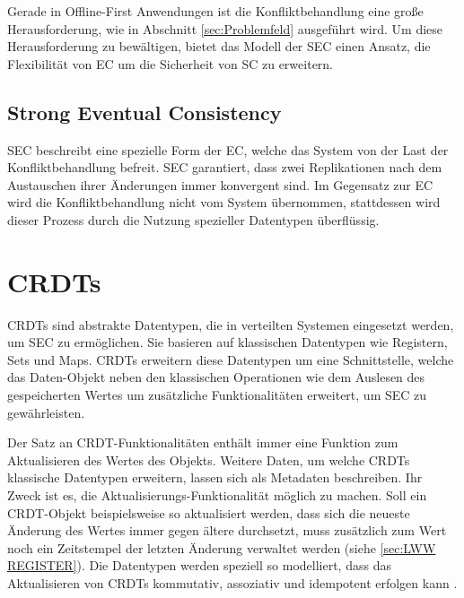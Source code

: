 \documentclass[a4paper, 12pt]{scrreprt}
\begin{document}
Gerade in Offline-First Anwendungen ist die Konfliktbehandlung eine große Herausforderung, wie in Abschnitt \ref{sec:Problemfeld} ausgeführt wird. Um diese Herausforderung zu bewältigen, bietet das Modell der \acf{SEC} einen Ansatz, die Flexibilität von \ac{EC} um die Sicherheit von \ac{SC} zu erweitern. 




\subsection{Strong Eventual Consistency}


\ac{SEC} beschreibt eine spezielle Form der \acf{EC}, welche das System von der Last der Konfliktbehandlung befreit. \ac{SEC} garantiert, dass zwei Replikationen nach dem Austauschen ihrer Änderungen immer konvergent sind. Im Gegensatz zur \ac{EC} wird die Konfliktbehandlung nicht vom System übernommen, stattdessen wird dieser Prozess durch die Nutzung spezieller Datentypen überflüssig. 


\section{CRDTs}

CRDTs sind abstrakte Datentypen, die in verteilten Systemen eingesetzt werden, um \ac{SEC} zu ermöglichen. Sie basieren auf klassischen Datentypen wie Registern, Sets und Maps. CRDTs erweitern diese Datentypen um eine Schnittstelle, welche das Daten-Objekt neben den klassischen Operationen wie dem Auslesen des gespeicherten Wertes um zusätzliche Funktionalitäten erweitert, um \ac{SEC} zu gewährleisten.\autocite[S.1 ]{ArticleCRDTOverview}

Der Satz an CRDT-Funktionalitäten enthält immer eine Funktion zum Aktualisieren des Wertes des Objekts. Weitere Daten, um welche CRDTs klassische Datentypen erweitern, lassen sich als Metadaten beschreiben. Ihr Zweck ist es, die Aktualisierungs-Funktionalität möglich zu machen. Soll ein CRDT-Objekt beispielsweise so aktualisiert werden, dass sich die neueste Änderung des Wertes immer gegen ältere durchsetzt, muss zusätzlich zum Wert noch ein Zeitstempel der letzten Änderung verwaltet werden (siehe \ref{sec:LWW REGISTER}).
Die Datentypen werden speziell so modelliert, dass das Aktualisieren von CRDTs kommutativ, assoziativ und idempotent erfolgen kann \autocite{InproceedingsCrdtsInProduction}.
\end{document}
